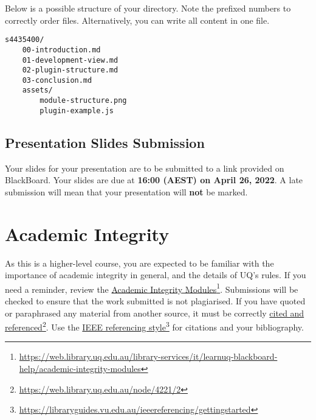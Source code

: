\documentclass{csse4400}
\begin{document}
\noindent
Below is a possible structure of your directory. Note the prefixed numbers to correctly order files.
Alternatively, you can write all content in one file.

\begin{verbatim}
s4435400/
    00-introduction.md
    01-development-view.md
    02-plugin-structure.md
    03-conclusion.md
    assets/
        module-structure.png
        plugin-example.js
\end{verbatim}

\subsection{Presentation Slides Submission}
Your slides for your presentation are to be submitted to a link provided on BlackBoard.
Your slides are due at \textbf{16:00 (AEST) on April 26, 2022}. A late submission will mean that your presentation will \textbf{not} be marked.


\section{Academic Integrity}
As this is a higher-level course, you are expected to be familiar with the importance of academic integrity in general, and the details of UQ's rules.
If you need a reminder, review the \href{https://web.library.uq.edu.au/library-services/it/learnuq-blackboard-help/academic-integrity-modules}
{Academic Integrity Modules}\footnote{\url{https://web.library.uq.edu.au/library-services/it/learnuq-blackboard-help/academic-integrity-modules}}.
Submissions will be checked to ensure that the work submitted is not plagiarised.
If you have quoted or paraphrased any material from another source, it must be correctly \href{https://web.library.uq.edu.au/node/4221/2}
{cited and referenced}\footnote{\url{https://web.library.uq.edu.au/node/4221/2}}.
Use the \href{https://libraryguides.vu.edu.au/ieeereferencing/gettingstarted}
{IEEE referencing style}\footnote{\url{https://libraryguides.vu.edu.au/ieeereferencing/gettingstarted}} for citations and your bibliography.
\end{document}
